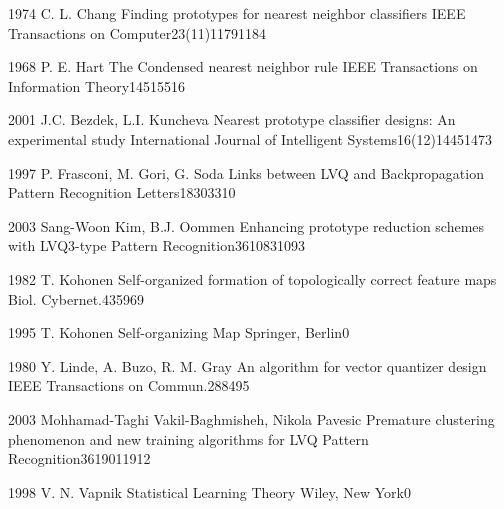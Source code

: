 
 {1974} {C. L. Chang}
{Finding prototypes for nearest neighbor classifiers}
{IEEE Transactions on Computer}{23(11)}{1179}{1184}

 {1968} {P. E. Hart}
{The Condensed nearest neighbor rule}
{IEEE Transactions on Information Theory}{14}{515}{516}

 {2001} {J.C. Bezdek, L.I. Kuncheva}
{Nearest prototype classifier designs: An experimental study}
{International Journal of Intelligent Systems}{16(12)}{1445}{1473}

 {1997} {P. Frasconi, M. Gori, G. Soda}
{Links between LVQ and Backpropagation}
{Pattern Recognition Letters}{18}{303}{310}

 {2003} {Sang-Woon Kim, B.J. Oommen}
{Enhancing prototype reduction schemes with LVQ3-type}
{Pattern Recognition}{36}{1083}{1093}

 {1982} {T. Kohonen}
{Self-organized formation of topologically correct feature maps}
{Biol. Cybernet.}{43}{59}{69}

 {1995} {T. Kohonen}
{Self-organizing Map}
{Springer, Berlin}{}{0}{}

 {1980} {Y. Linde, A. Buzo, R. M. Gray}
{An algorithm for vector quantizer design}
{IEEE Transactions on Commun.}{28}{84}{95}

 {2003} {Mohhamad-Taghi Vakil-Baghmisheh, Nikola Pavesic}
{Premature clustering phenomenon and new training algorithms for LVQ}
{Pattern Recognition}{36}{1901}{1912}

 {1998} {V. N. Vapnik}
{Statistical Learning Theory}
{Wiley, New York}{}{0}{}

